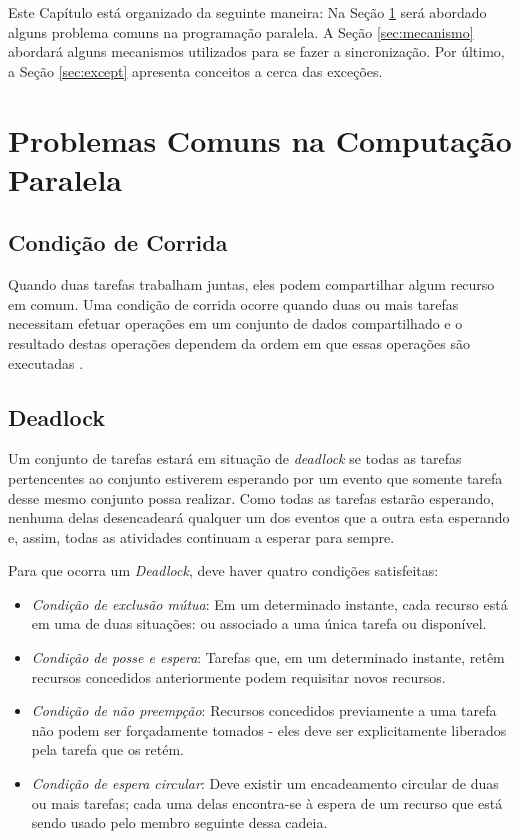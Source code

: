 Este Capítulo está organizado da seguinte maneira: Na Seção \ref{sec:prob}
será abordado alguns problema comuns na programação paralela. A Seção
\ref{sec:mecanismo} abordará alguns mecanismos utilizados para se fazer
a sincronização. Por último, a Seção \ref{sec:except} apresenta 
conceitos a cerca das exceções.

\section{Problemas Comuns na Computação Paralela}
\label{sec:prob}

\subsection{Condição de Corrida}

Quando duas tarefas trabalham juntas, eles podem compartilhar algum recurso
em comum. Uma condição de corrida ocorre quando duas ou mais tarefas
necessitam efetuar operações em um conjunto de dados compartilhado e o 
resultado destas operações dependem da ordem em que essas operações
são executadas \cite{tanen}.

\subsection{Deadlock}

Um conjunto de tarefas estará em situação de \textit{deadlock} se todas as
tarefas pertencentes ao conjunto estiverem esperando por um evento que somente
tarefa desse mesmo conjunto possa realizar. Como todas as tarefas estarão
esperando, nenhuma delas desencadeará qualquer um dos eventos que a outra
esta esperando e, assim, todas as atividades continuam a esperar para sempre.

Para que ocorra um \textit{Deadlock}, deve haver quatro condições satisfeitas:

\begin{itemize}
\item \textit{Condição de exclusão mútua}: Em um determinado instante,
cada recurso está em uma de duas situações: ou associado a uma única tarefa
ou disponível. 
\item \textit{Condição de posse e espera}: Tarefas que,
em um determinado instante, retêm recursos concedidos anteriormente podem
requisitar novos recursos. 
\item \textit{Condição de não preempção}:
Recursos concedidos previamente a uma tarefa não podem ser forçadamente
tomados - eles deve ser explicitamente liberados pela tarefa que os retém.
\item \textit{Condição de espera circular}: Deve existir um encadeamento
circular de duas ou mais tarefas; cada uma delas encontra-se à espera de
um recurso que está sendo usado pelo membro seguinte dessa cadeia.
\end{itemize}

